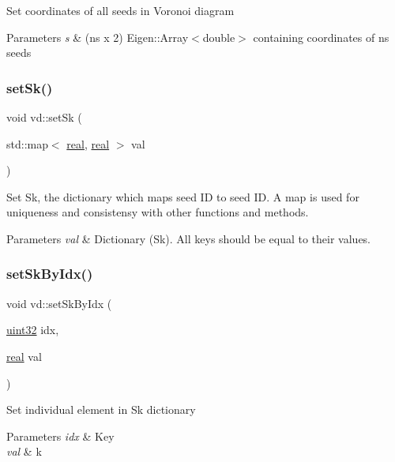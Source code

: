 Set coordinates of all seeds in Voronoi diagram 
\begin{DoxyParams}{Parameters}
{\em s} & (ns x 2) Eigen\+::\+Array$<$double$>$ containing coordinates of ns seeds \\
\hline
\end{DoxyParams}
\mbox{\label{classvd_a42dc1ab4c7033c49c0b3716d461ad2ef}} 
\subsubsection{\texorpdfstring{set\+Sk()}{setSk()}}
{\footnotesize\ttfamily void vd\+::set\+Sk (\begin{DoxyParamCaption}\item[{std\+::map$<$ \mbox{\hyperlink{typedefs_8cpp_a58a0c7cf2501f4492da833421be92547}{real}}, \mbox{\hyperlink{typedefs_8cpp_a58a0c7cf2501f4492da833421be92547}{real}} $>$}]{val }\end{DoxyParamCaption})}

Set Sk, the dictionary which maps seed ID to seed ID. A map is used for uniqueness and consistensy with other functions and methods. 
\begin{DoxyParams}{Parameters}
{\em val} & Dictionary (Sk). All keys should be equal to their values. \\
\hline
\end{DoxyParams}
\mbox{\label{classvd_a578ca6980896563397214c584401c7f5}} 
\subsubsection{\texorpdfstring{set\+Sk\+By\+Idx()}{setSkByIdx()}}
{\footnotesize\ttfamily void vd\+::set\+Sk\+By\+Idx (\begin{DoxyParamCaption}\item[{\mbox{\hyperlink{typedefs_8cpp_a8ad23e2333787a214e20a58a284a5a60}{uint32}}}]{idx,  }\item[{\mbox{\hyperlink{typedefs_8cpp_a58a0c7cf2501f4492da833421be92547}{real}}}]{val }\end{DoxyParamCaption})}

Set individual element in Sk dictionary 
\begin{DoxyParams}{Parameters}
{\em idx} & Key \\
\hline
{\em val} & k \\
\hline
\end{DoxyParams}
\mbox{\label{classvd_afb492f7d32ff2a4d54bd531d57d66a1a}} 
